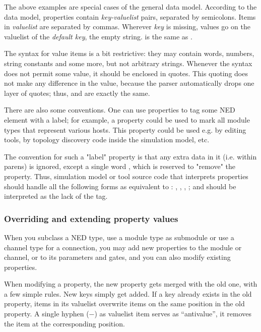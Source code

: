 The above examples are special cases of the general data model. According
to the data model, properties contain \textit{key-valuelist} pairs,
separated by semicolons. Items in \textit{valuelist} are separated by
commas. Wherever \textit{key} is missing, values go on the valuelist of the
\textit{default key}, the empty string.  is the same
as .

The syntax for value items is a bit restrictive: they may contain words,
numbers, string constants and some more, but not arbitrary strings.
Whenever the syntax does not permit some value, it should be enclosed in
quotes. This quoting does not make any difference in the value, because
the parser automatically drops one layer of quotes; thus, 
and  are exactly the same.

There are also some conventions. One can use properties to tag some NED element
with a label; for example, a  property could be used to mark
all module types that represent various hosts. This property could be used
e.g. by editing tools, by topology discovery code inside the simulation model, etc.

The convention for such a "label" property is that any extra data in it
(i.e. within parens) is ignored, except a single word , which is
reserved to "remove" the property. Thus, simulation model or tool source
code that interprets properties should handle all the following forms as
equivalent to : , ,
, ; and
 should be interpreted as the lack of the 
tag.


\subsubsection{Overriding and extending property values}

When you subclass a NED type, use a module type as submodule or use a channel
type for a connection, you may add new properties to the module or channel,
or to its parameters and gates, and you can also modify existing properties.

When modifying a property, the new property gets merged with the old one,
with a few simple rules. New keys simply get added. If a key already
exists in the old property, items in its valuelist overwrite items on
the same position in the old property. A single hyphen ($-$) as
valuelist item serves as ``antivalue'', it removes the item at the
corresponding position.


